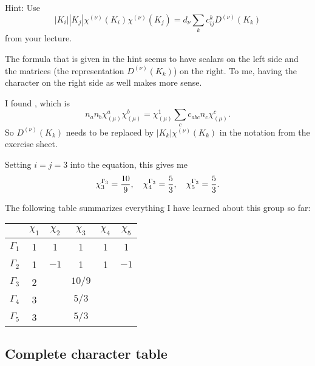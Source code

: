 \documentclass[11pt, english, fleqn, DIV=15, headinclude, BCOR=1cm]{scrartcl}
\begin{document}
\begin{problem}
    Hint: Use
    \[
        |K_i| |K_j| \chi^{(\nu)}(K_i) \chi^{(\nu)}(K_j)
        = d_\nu \sum_k c_{ij}^k D^{(\nu)}(K_k)
    \]
    from your lecture.
\end{problem}

The formula that is given in the hint seems to have scalars on the left side
and the matrices (the representation $D^{(\nu)}(K_k)$) on the right. To me,
having the character on the right side as well makes more sense.

I found \parencite[(4.64)]{Luedeling/physics751-notes}, which is
\[
    n_a n_b \chi_{(\mu)}^a \chi_{(\mu)}^b = \chi_{(\mu)}^1 \sum_c c_{abc} n_c
    \chi_{(\mu)}^c.
\]
So $D^{(\nu)}(K_k)$ needs to be replaced by $|K_k| \chi^{(\nu)}(K_k)$ in the
notation from the exercise sheet.

Setting $i = j
= 3$ into the equation, this gives me
\[
    \chi^{\Gamma_3}_3 = \frac{10}{9}
    ,\quad
    \chi^{\Gamma_3}_4 = \frac{5}{3}
    ,\quad
    \chi^{\Gamma_3}_5 = \frac{5}{3}.
\]

The following table summarizes everything I have learned about this group so
far:

\begin{tabular}{c|ccccc}
    & $\chi_1$ & $\chi_2$ & $\chi_3$ & $\chi_4$ & $\chi_5$ \\
    \midrule
    $\Gamma_1$ & 1 & 1 & 1 & 1 & 1 \\
    $\Gamma_2$ & 1 & $-1$ & 1 & 1 & $-1$ \\
    $\Gamma_3$ & 2 & & $10/9$ & & \\
    $\Gamma_4$ & 3 & & $5/3$ & & \\
    $\Gamma_5$ & 3 & & $5/3$ & & \\
\end{tabular}

\subsection{Complete character table}
\end{document}
